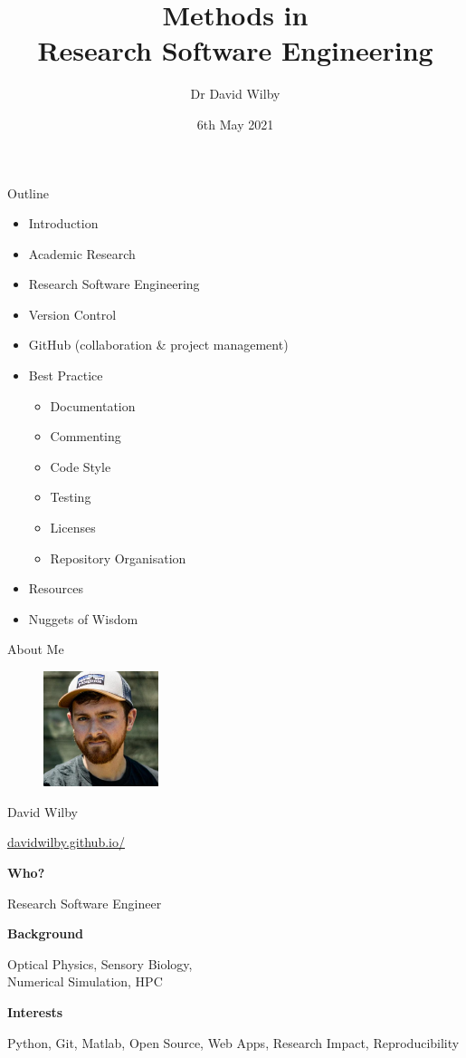 \documentclass{beamer} %
\title{Methods in \\Research Software Engineering}
\date{6th May 2021}
\author{Dr David Wilby}
\institute{Research Software Engineering Team,\\ The University of Sheffield}
\begin{document}
  \begin{frame}
    \titlepage
  \end{frame}

  \begin{frame}{Outline}
    \begin{itemize}
      \item Introduction
      \item Academic Research
      \item Research Software Engineering
      \item Version Control
      \item GitHub (collaboration \& project management)
      \item Best Practice
      \begin{itemize}
        \item Documentation
        \item Commenting
        \item Code Style
        \item Testing
        \item Licenses
        \item Repository Organisation
      \end{itemize}
      \item Resources
      \item Nuggets of Wisdom
    \end{itemize}
  \end{frame}

  \begin{frame}{About Me}

    \begin{figure}
        \includegraphics[width=0.3\textwidth]{wilby}
    \end{figure}

    David Wilby

    \href{https://davidwilby.github.io/}{davidwilby.github.io/}

    \textbf{Who?}
    
    Research Software Engineer

    \textbf{Background}

    Optical Physics, Sensory Biology, \\Numerical Simulation, HPC

    \textbf{Interests}

    Python, Git, Matlab, Open Source, Web Apps, Research Impact, Reproducibility

  \end{frame}
\end{document}

